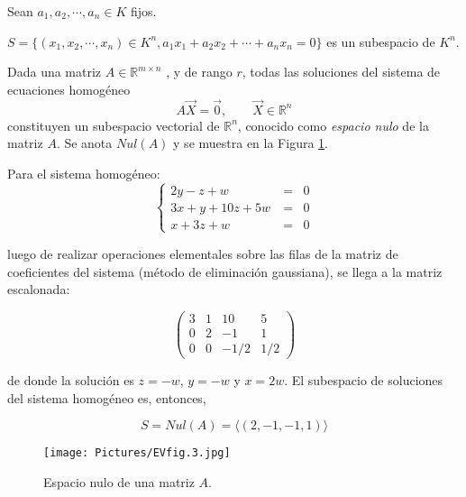 
\begin{example}
\label{ejintsub}
Sean $a_1, a_2, \cdots, a_n \in K $ fijos.  

$S=\{ (x_1,x_2,\cdots, x_n) \in K^n, a_1x_1+a_2x_2+\cdots +a_nx_n=0\}$ es un subespacio de $K^n$.
\end{example}


\begin{example}
\label{ejsistema}
Dada una matriz $A \in \mathbb{R}^{m \times n}$ , y de rango $r$, todas las soluciones del sistema de ecuaciones homogéneo
$$A\vec{X}=\vec{0}, \qquad  \vec{X}\in \mathbb{R}^n$$
constituyen un subespacio vectorial de $\mathbb{R}^n$, conocido como \textit{espacio nulo} de la matriz $A$. Se anota $Nul(A)$  y se muestra en la  Figura \ref{EVfig. 3.}.


\bigskip

Para el sistema homogéneo:
\begin{equation} 
\left\{ \begin{array} {ccl} \nonumber
                    2y-z+w &\ =&0      \\
                     3x+y+10z+5w &\ = &0  \\
                    x+3z + w &\ =&0 \label{ejemplosist}
                   \end{array}
           \right.
\end{equation}

\bigskip
\noindent
luego de realizar operaciones elementales sobre las filas de la matriz de coeficientes del sistema (método de eliminación gaussiana), se llega a la matriz escalonada:

\[ \left( \begin{array}{cccc}
3 & 1 & 10 & 5\\0 & 2 & -1 &1  \\ 0 & 0 & -1/2 & 1/2 
\end{array}
\right )
\]

\bigskip

\noindent
de donde la solución es $z=-w$, $y=-w$ y $x=2w$. El subespacio  de soluciones del sistema homogéneo es, entonces,

$$S=Nul(A) = \langle (2,-1,-1,1) \rangle $$
\end{example}


\begin{figure}
    \centering
    \texttt{[image: Pictures/EVfig.3.jpg]}
    \caption{Espacio nulo de una matriz $A$.}
    \label{EVfig. 3.}
\end{figure}

